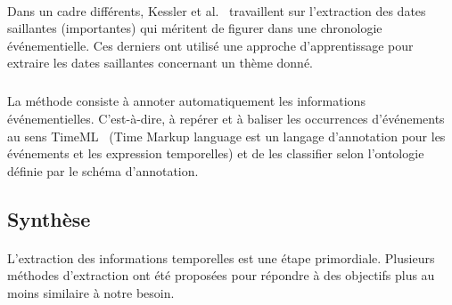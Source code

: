 \paragraph{}
Dans un cadre différents, Kessler et al.~\cite{kessler2013} travaillent sur l'extraction des dates saillantes (importantes) qui méritent de figurer dans une chronologie événementielle.
Ces derniers ont utilisé une approche d’apprentissage pour extraire les dates saillantes concernant un thème donné.
\subparagraph{}
La méthode consiste à annoter automatiquement les informations événementielles. C’est-à-dire, à  repérer et à baliser les occurrences d’événements au sens TimeML~\cite{timml} (Time Markup language est un langage d'annotation pour les événements et les expression temporelles) et de les classifier selon l’ontologie définie par le schéma d’annotation.
\subsection{Synthèse}
\paragraph{}
L'extraction des informations temporelles est une étape primordiale. Plusieurs méthodes d'extraction ont été proposées pour répondre à des objectifs plus au moins similaire à notre besoin.


